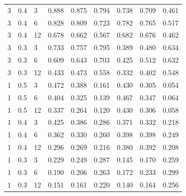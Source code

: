 \begin{refsection}
\begin{otherlanguage}{english}
\begin{scriptsize}
\begin{longtable}{lllllllll}
\cellcolor[HTML]{C0C0C0}3 & \cellcolor[HTML]{C0C0C0}0.4 & \cellcolor[HTML]{C0C0C0}3 & 0.888 & 0.875 & 0.794 & 0.738 & 0.709 & 0.461 \\
\cellcolor[HTML]{C0C0C0}3 & \cellcolor[HTML]{C0C0C0}0.4 & \cellcolor[HTML]{C0C0C0}6 & 0.828 & 0.809 & 0.723 & 0.782 & 0.765 & 0.517 \\
\cellcolor[HTML]{C0C0C0}3 & \cellcolor[HTML]{C0C0C0}0.4 & \cellcolor[HTML]{C0C0C0}12 & 0.678 & 0.662 & 0.567 & 0.682 & 0.676 & 0.462 \\
\cellcolor[HTML]{C0C0C0}3 & \cellcolor[HTML]{C0C0C0}0.3 & \cellcolor[HTML]{C0C0C0}3 & 0.733 & 0.757 & 0.795 & 0.389 & 0.480 & 0.634 \\
\cellcolor[HTML]{C0C0C0}3 & \cellcolor[HTML]{C0C0C0}0.3 & \cellcolor[HTML]{C0C0C0}6 & 0.609 & 0.643 & 0.703 & 0.425 & 0.512 & 0.632 \\
\cellcolor[HTML]{C0C0C0}3 & \cellcolor[HTML]{C0C0C0}0.3 & \cellcolor[HTML]{C0C0C0}12 & 0.433 & 0.473 & 0.558 & 0.332 & 0.402 & 0.548 \\
\cellcolor[HTML]{C0C0C0}1 & \cellcolor[HTML]{C0C0C0}0.5 & \cellcolor[HTML]{C0C0C0}3 & 0.472 & 0.388 & 0.161 & 0.430 & 0.305 & 0.054 \\
\cellcolor[HTML]{C0C0C0}1 & \cellcolor[HTML]{C0C0C0}0.5 & \cellcolor[HTML]{C0C0C0}6 & 0.404 & 0.325 & 0.139 & 0.467 & 0.347 & 0.064 \\
\cellcolor[HTML]{C0C0C0}1 & \cellcolor[HTML]{C0C0C0}0.5 & \cellcolor[HTML]{C0C0C0}12 & 0.337 & 0.264 & 0.120 & 0.430 & 0.306 & 0.058 \\
\cellcolor[HTML]{C0C0C0}1 & \cellcolor[HTML]{C0C0C0}0.4 & \cellcolor[HTML]{C0C0C0}3 & 0.425 & 0.386 & 0.286 & 0.371 & 0.332 & 0.218 \\
\cellcolor[HTML]{C0C0C0}1 & \cellcolor[HTML]{C0C0C0}0.4 & \cellcolor[HTML]{C0C0C0}6 & 0.362 & 0.330 & 0.260 & 0.398 & 0.398 & 0.249 \\
\cellcolor[HTML]{C0C0C0}1 & \cellcolor[HTML]{C0C0C0}0.4 & \cellcolor[HTML]{C0C0C0}12 & 0.296 & 0.269 & 0.216 & 0.380 & 0.392 & 0.208 \\
\cellcolor[HTML]{C0C0C0}1 & \cellcolor[HTML]{C0C0C0}0.3 & \cellcolor[HTML]{C0C0C0}3 & 0.229 & 0.249 & 0.287 & 0.145 & 0.170 & 0.259 \\
\cellcolor[HTML]{C0C0C0}1 & \cellcolor[HTML]{C0C0C0}0.3 & \cellcolor[HTML]{C0C0C0}6 & 0.190 & 0.206 & 0.263 & 0.172 & 0.233 & 0.299 \\
\cellcolor[HTML]{C0C0C0}1 & \cellcolor[HTML]{C0C0C0}0.3 & \cellcolor[HTML]{C0C0C0}12 & 0.151 & 0.161 & 0.220 & 0.140 & 0.164 & 0.256 \\ \hline

\end{longtable}
\end{scriptsize}
\end{otherlanguage}
\end{refsection}
